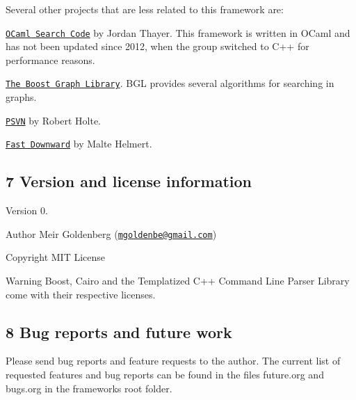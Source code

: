 Several other projects that are less related to this framework are\+:
\begin{DoxyItemize}
\item \href{https://github.com/jordanthayer/ocaml-search}{\tt O\+Caml Search Code} by Jordan Thayer. This framework is written in {\ttfamily O\+Caml} and has not been updated since 2012, when the group switched to {\ttfamily C++} for performance reasons.
\item \href{http://www.boost.org/doc/libs/1_61_0/libs/graph/doc/}{\tt The Boost Graph Library}. {\ttfamily B\+GL} provides several algorithms for searching in graphs.
\item \href{https://era.library.ualberta.ca/downloads/7m01bn08g}{\tt P\+S\+VN} by Robert Holte.
\item \href{http://www.fast-downward.org/}{\tt Fast Downward} by Malte Helmert.
\end{DoxyItemize}\hypertarget{index_s-version}{}\subsection{7 Version and license information}\label{index_s-version}
\begin{DoxyVersion}{Version}
0. 
\end{DoxyVersion}
\begin{DoxyAuthor}{Author}
Meir Goldenberg (\href{mailto:mgoldenbe@gmail.com}{\tt mgoldenbe@gmail.\+com}) 
\end{DoxyAuthor}
\begin{DoxyCopyright}{Copyright}
M\+IT License 
\end{DoxyCopyright}
\begin{DoxyWarning}{Warning}
Boost, Cairo and the Templatized C++ Command Line Parser Library come with their respective licenses.
\end{DoxyWarning}
\hypertarget{index_s-future}{}\subsection{8 Bug reports and future work}\label{index_s-future}
Please send bug reports and feature requests to the author. The current list of requested features and bug reports can be found in the files {\ttfamily future.\+org} and {\ttfamily bugs.\+org} in the framework\textquotesingle{}s root folder. 